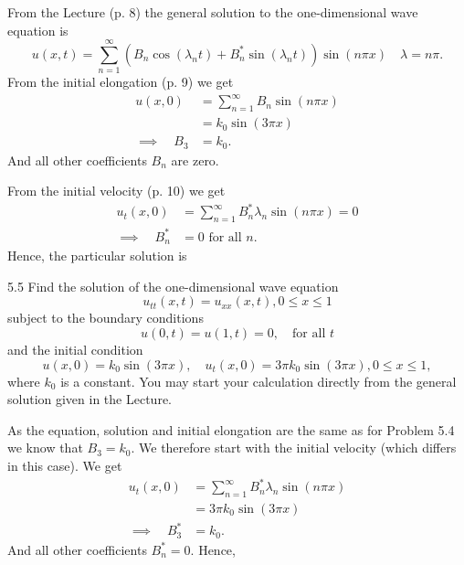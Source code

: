 \begin{derivation}
  From the Lecture (p. 8) the general solution to the one-dimensional wave equation is
  \begin{equation*}
    u(x,t) = \sum_{n = 1}^{\infty} \left( B_n \cos \left( \lambda_n t \right) + B_n^{*} \sin \left( \lambda_n t \right) \right) \sin \left( n \pi x \right) \quad \lambda = n \pi
  .\end{equation*}
  From the initial elongation (p. 9) we get
  \begin{align*}
    u(x,0) &= \sum_{n = 1}^{\infty} B_n \sin \left( n \pi x \right) \\
    &= k_0 \sin \left( 3\pi x \right) \\
    \implies \quad B_3 &= k_0
  .\end{align*}
  And all other coefficients $B_n$ are zero.

  From the initial velocity (p. 10) we get
  \begin{align*}
    u_t(x,0) &= \sum_{n = 1}^{\infty} B_n^{*}\lambda_n \sin \left( n \pi x \right) = 0\\
    \implies \quad B_n^{*} &= 0 \text{ for all } n
  .\end{align*}
  Hence, the particular solution is
\end{derivation}



\begin{problem}{5.5}
  Find the solution of the one-dimensional wave equation
\[ 
u_{tt} (x,t) = u_{xx}(x,t), 0 \leq x \leq 1
\]
subject to the boundary conditions
\[ 
u(0,t) = u(1,t) = 0, \quad \text{for all } t
\]
and the initial condition
\[ 
u(x,0) = k_0 \sin \left( 3 \pi x \right), \quad u_t (x,0) = 3\pi k_0 \sin \left( 3 \pi x \right), 0 \leq x \leq 1,
\]
where $k_0$ is a constant.
You may start your calculation directly from the general solution given in the Lecture.
\end{problem}

\begin{derivation}
  As the equation, solution and initial elongation are the same as for Problem 5.4 we know that $B_3 = k_0$.
  We therefore start with the initial velocity (which differs in this case).
  We get
  \begin{align*}
    u_t(x,0) &= \sum_{n = 1}^{\infty} B_n^{*}\lambda_n \sin \left( n \pi x \right) \\
    &= 3 \pi k_0 \sin \left( 3 \pi x \right) \\
    \implies \quad B_3^{*} &= k_0
  .\end{align*}
  And all other coefficients $B_n^{*} = 0$.
  Hence,
\end{derivation}

